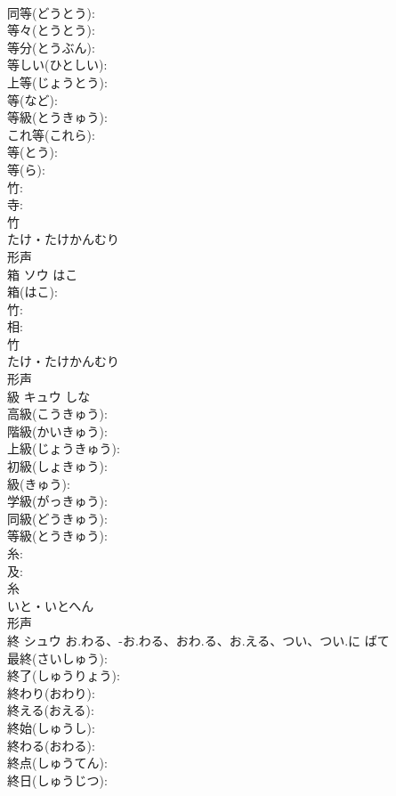 \documentclass[8pt]{extreport}
\begin{document}
\begin{CJK}{UTF8}{min}
\\	同等(どうとう): 
\\	等々(とうとう): 
\\	等分(とうぶん): 
\\	等しい(ひとしい): 
\\	上等(じょうとう): 
\\	等(など): 
\\	等級(とうきゅう): 
\\	これ等(これら): 
\\	等(とう): 
\\	等(ら): 
\\	竹: 
\\	寺: 
\\	竹	
\\	たけ・たけかんむり	
\\	形声 
\\	箱	ソウ	はこ		
\\	箱(はこ): 
\\	竹: 
\\	相: 
\\	竹	
\\	たけ・たけかんむり	
\\	形声 
\\	級	キュウ		しな	
\\	高級(こうきゅう): 
\\	階級(かいきゅう): 
\\	上級(じょうきゅう): 
\\	初級(しょきゅう): 
\\	級(きゅう): 
\\	学級(がっきゅう): 
\\	同級(どうきゅう): 
\\	等級(とうきゅう): 
\\	糸: 
\\	及: 
\\	糸	
\\	いと・いとへん	
\\	形声 
\\	終	シュウ	お.わる、-お.わる、おわ.る、お.える、つい、つい.に	ばて	
\\	最終(さいしゅう): 
\\	終了(しゅうりょう): 
\\	終わり(おわり): 
\\	終える(おえる): 
\\	終始(しゅうし): 
\\	終わる(おわる): 
\\	終点(しゅうてん): 
\\	終日(しゅうじつ): 

\end{CJK}
\end{document}
